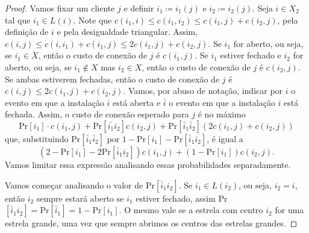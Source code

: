 \begin{proof}
    Vamos fixar um cliente $j$ e definir $i_1 \coloneqq i_1(j)$ e $i_2 \coloneqq i_2(j)$. Seja $i \in X_2$ tal que $i_1 \in L(i)$. Note que $c(i_1,i) \leq c(i_1,i_2) \leq c(i_1,j) + c(i_2,j)$, pela definição de $i$ e pela desigualdade triangular. Assim, $c(i,j) \leq c(i,i_1) + c(i_1,j)\leq 2 c(i_1,j) + c(i_2,j)$. Se $i_1$ for aberto, ou seja, se $i_1 \in X$, então o custo de conexão de $j$ é $c(i_1,j)$. Se $i_1$ estiver fechado e $i_2$ for aberto, ou seja, se $i_1 \not \in X$ mas $i_2 \in X$, então o custo de conexão de $j$ é $c(i_2,j)$. Se ambas estiverem fechadas, então o custo de conexão de $j$ é $c(i,j) \leq 2c(i_1,j) + c(i_2,j)$. Vamos, por abuso de notação, indicar por $i$ o evento em que a instalação $i$ está aberta e $\bar{i}$ o evento em que a instalação $i$ está fechada. Assim, o custo de conexão esperado para $j$ é no máximo
    \[ \text{Pr}[i_1]\cdot c(i_1,j) + \text{Pr}[\bar{i_1}i_2] c(i_2,j) + \text{Pr}[\bar{i}_1\bar{i}_2] (2c(i_1,j) + c(i_2,j))\] 
    que, substituindo Pr$[\bar{i}_1\bar{i}_2]$ por $1 - \text{Pr}[i_1] - \text{Pr}[\bar{i}_1i_2]$, é igual a
    \begin{equation}
        (2 - \text{Pr}[i_1] - 2 \text{Pr}[\bar{i}_1i_2]) c(i_1,j) + (1 - \text{Pr}[i_1])c(i_2,j). \label{pseudo:4}
    \end{equation}
    Vamos limitar essa expressão analisando essas probabilidades separadamente.

    Vamos começar analisando o valor de Pr$[\bar{i}_1i_2]$. Se $i_1 \in L(i_2)$, ou seja, $i_2 = i$, então $i_2$ sempre estará aberto se $i_1$ estiver fechado, assim Pr$[\bar{i}_1i_2] = \text{Pr}[\bar{i}_1] = 1 - \text{Pr}[i_1]$. O mesmo vale se a estrela com centro $i_2$ for uma estrela grande, uma vez que sempre abrimos os centros das estrelas grandes.


\end{proof}
